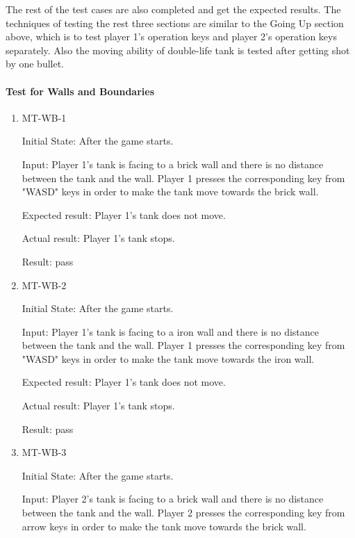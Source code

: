 \documentclass[12pt, titlepage]{article}
\begin{document}
The rest of the test cases are also completed and get the expected results. The techniques of testing the rest three sections are similar to the Going Up section above, which is to test player 1's operation keys and player 2's operation keys separately. Also the moving ability of double-life tank is tested after getting shot by one bullet. 

\paragraph{Test for Walls and Boundaries}

\begin{enumerate}

\item{MT-WB-1\\}
					
Initial State: After the game starts.
					
Input: Player 1's tank is facing to a brick wall and there is no distance between the tank and the wall. Player 1 presses the corresponding key from "WASD" keys in order to make the tank move towards the brick wall.
					
Expected result: Player 1's tank does not move.
					
Actual result: Player 1's tank stops.

Result: pass

\item{MT-WB-2\\}
					
Initial State: After the game starts.
					
Input: Player 1's tank is facing to a iron wall and there is no distance between the tank and the wall. Player 1 presses the corresponding key from "WASD" keys in order to make the tank move towards the iron wall.
					
Expected result: Player 1's tank does not move.
					
Actual result: Player 1's tank stops.

Result: pass

\item{MT-WB-3\\}
					
Initial State: After the game starts.
					
Input: Player 2's tank is facing to a brick wall and there is no distance between the tank and the wall. Player 2 presses the corresponding key from arrow keys in order to make the tank move towards the brick wall.
					

\end{enumerate}
\end{document}
